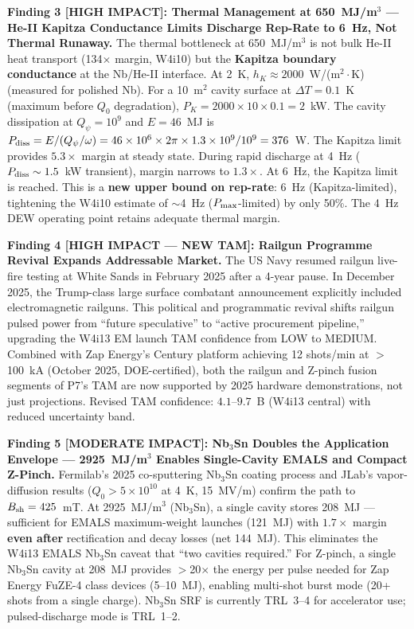 \documentclass[11pt]{article}
\newcommand{\ee}[1]{\times 10^{#1}}
\begin{document}
\begin{tcolorbox}[colback=blue!5!white, colframe=blue!60!black,
  title=\textbf{W4i14 P7 --- Top 5 Findings (Ranked by Impact)}]
\textbf{Finding 3 [HIGH IMPACT]: Thermal Management at 650~MJ/m$^3$ ---
He-II Kapitza Conductance Limits Discharge Rep-Rate to 6~Hz, Not
Thermal Runaway.} The thermal bottleneck at 650~MJ/m$^3$ is not
bulk He-II heat transport (134$\times$ margin, W4i10) but the
\textbf{Kapitza boundary conductance} at the Nb/He-II interface.
At 2~K, $h_K \approx 2000$~W/(m$^2\cdot$K) (measured for polished
Nb). For a 10~m$^2$ cavity surface at $\Delta T = 0.1$~K (maximum
before $Q_0$ degradation), $P_K = 2000 \times 10 \times 0.1 = 2$~kW.
The cavity dissipation at $Q_\psi = 10^9$ and $E = 46$~MJ is
$P_{\rm diss} = E/(Q_\psi/\omega) = 46\ee{6} \times 2\pi \times
1.3\ee{9} / 10^9 = 376$~W. The Kapitza limit provides $5.3\times$
margin at steady state. During rapid discharge at 4~Hz ($P_{\rm diss}
\sim 1.5$~kW transient), margin narrows to $1.3\times$. At 6~Hz,
the Kapitza limit is reached. This is a \textbf{new upper bound on
rep-rate}: 6~Hz (Kapitza-limited), tightening the W4i10 estimate
of $\sim$4~Hz ($P_{\rm max}$-limited) by only 50\%. The 4~Hz DEW
operating point retains adequate thermal margin.

\textbf{Finding 4 [HIGH IMPACT --- NEW TAM]: Railgun Programme
Revival Expands Addressable Market.} The US Navy resumed railgun
live-fire testing at White Sands in February 2025 after a 4-year
pause. In December 2025, the Trump-class large surface combatant
announcement explicitly included electromagnetic railguns. This
political and programmatic revival shifts railgun pulsed power from
``future speculative'' to ``active procurement pipeline,'' upgrading
the W4i13 EM launch TAM confidence from LOW to MEDIUM. Combined with
Zap Energy's Century platform achieving 12 shots/min at $>$100~kA
(October 2025, DOE-certified), both the railgun and Z-pinch fusion
segments of P7's TAM are now supported by 2025 hardware demonstrations,
not just projections. Revised TAM confidence: $4.1$--$9.7$~B (W4i13
central) with reduced uncertainty band.

\textbf{Finding 5 [MODERATE IMPACT]: Nb$_3$Sn Doubles the
Application Envelope --- 2925~MJ/m$^3$ Enables Single-Cavity
EMALS and Compact Z-Pinch.} Fermilab's 2025 co-sputtering Nb$_3$Sn
coating process and JLab's vapor-diffusion results ($Q_0 > 5\ee{10}$
at 4~K, 15~MV/m) confirm the path to $B_{\rm sh} = 425$~mT. At
2925~MJ/m$^3$ (Nb$_3$Sn), a single cavity stores 208~MJ --- sufficient
for EMALS maximum-weight launches (121~MJ) with $1.7\times$ margin
\textbf{even after} rectification and decay losses (net 144~MJ).
This eliminates the W4i13 EMALS Nb$_3$Sn caveat that ``two cavities
required.'' For Z-pinch, a single Nb$_3$Sn cavity at 208~MJ provides
$>$20$\times$ the energy per pulse needed for Zap Energy FuZE-4
class devices (5--10~MJ), enabling multi-shot burst mode (20+ shots
from a single charge). Nb$_3$Sn SRF is currently TRL~3--4 for
accelerator use; pulsed-discharge mode is TRL~1--2.

\end{tcolorbox}
\end{document}
